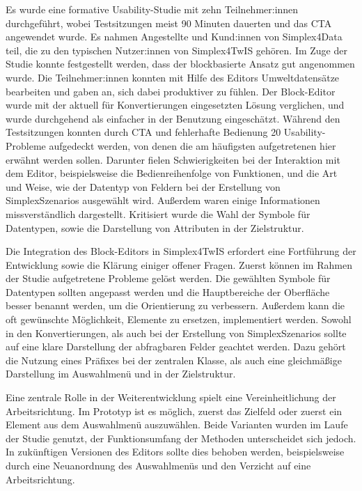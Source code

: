 \pskip
Es wurde eine formative Usability-Studie mit zehn Teilnehmer:innen durchgeführt, wobei Testsitzungen meist 90 Minuten dauerten und das \acf{CTA} angewendet wurde. Es nahmen Angestellte und Kund:innen von Simplex4Data teil, die zu den typischen Nutzer:innen von Simplex4TwIS gehören. Im Zuge der Studie konnte festgestellt werden, dass der blockbasierte Ansatz gut angenommen wurde. Die Teilnehmer:innen konnten mit Hilfe des Editors Umweltdatensätze bearbeiten und gaben an, sich dabei produktiver zu fühlen. Der Block-Editor wurde mit der aktuell für Konvertierungen eingesetzten Lösung verglichen, und wurde durchgehend als einfacher in der Benutzung eingeschätzt. Während den Testsitzungen konnten durch \ac{CTA} und fehlerhafte Bedienung 20 Usability-Probleme aufgedeckt werden, von denen die am häufigsten aufgetretenen hier erwähnt werden sollen. Darunter fielen Schwierigkeiten bei der Interaktion mit dem Editor, beispielsweise die Bedienreihenfolge von Funktionen, und die Art und Weise, wie der Datentyp von Feldern bei der Erstellung von SimplexSzenarios ausgewählt wird. Außerdem waren einige Informationen missverständlich dargestellt. Kritisiert wurde die Wahl der Symbole für Datentypen, sowie die Darstellung von Attributen in der Zielstruktur.

\pskip
Die Integration des Block-Editors in Simplex4TwIS erfordert eine Fortführung der Entwicklung sowie die Klärung einiger offener Fragen. Zuerst können im Rahmen der Studie aufgetretene Probleme gelöst werden. Die gewählten Symbole für Datentypen sollten angepasst werden und die Hauptbereiche der Oberfläche besser benannt werden, um die Orientierung zu verbessern. Außerdem kann die oft gewünschte Möglichkeit, Elemente zu ersetzen, implementiert werden. Sowohl in den Konvertierungen, als auch bei der Erstellung von SimplexSzenarios sollte auf eine klare Darstellung der abfragbaren Felder geachtet werden. Dazu gehört die Nutzung eines Präfixes bei der zentralen Klasse, als auch eine gleichmäßige Darstellung im Auswahlmenü und in der Zielstruktur.

Eine zentrale Rolle in der Weiterentwicklung spielt eine Vereinheitlichung der Arbeitsrichtung. Im Prototyp ist es möglich, zuerst das Zielfeld oder zuerst ein Element aus dem Auswahlmenü auszuwählen. Beide Varianten wurden im Laufe der Studie genutzt, der Funktionsumfang der Methoden unterscheidet sich jedoch. In zukünftigen Versionen des Editors sollte dies behoben werden, beispielsweise durch eine Neuanordnung des Auswahlmenüs und den Verzicht auf eine Arbeitsrichtung.

